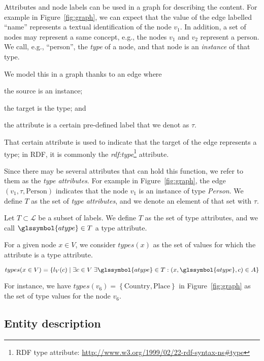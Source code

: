 Attributes and node labels can be used in a graph for describing the content. For example in Figure~\ref{fig:graph}, we can expect that the value of the edge labelled ``name'' represents a textual identification of the node $v_1$. In addition, a set of nodes may represent a same concept, e.g., the nodes $v_1$ and $v_2$ represent a person. We call, e.g., ``person'', the \emph{type} of a node, and that node is an \emph{instance} of that type.

We model this in a graph thanks to an edge where
\begin{inparaenum}[(1)]
\item the source is an instance;
\item the target is the type; and
\item the attribute is a certain pre-defined label that we denot as $\tau$.
\end{inparaenum}
That certain attribute is used to indicate that the target of the edge represents a type; in RDF, it is commonly the \emph{rdf:type}\footnote{RDF type attribute: \url{http://www.w3.org/1999/02/22-rdf-syntax-ns\#type}} attribute.

Since there may be several attributes that can hold this function, we refer to them as the \emph{type attributes}. For example in Figure~\ref{fig:graph}, the edge $(v_1, \tau, \text{Person})$ indicates that the node $v_1$ is an instance of type \emph{Person}.
We define $T$ as the set of \emph{type attributes}, and we denote an element of that set with $\tau$.%

\begin{definition}
Let $T \subset \mathcal{L}$ be a subset of labels.
We define $T$ as the set of type attributes, and we call $\glssymbol{atype} \in T$ a type attribute.
\end{definition}

For a given node $x \in V$, we consider $types(x)$ as the set of values for which the attribute is a type attribute.

$$
types(x\in V) = \left\lbrace l_V(c) \mid \exists c \in V\; \exists \glssymbol{atype} \in T: (x, \glssymbol{atype}, c) \in A \right\rbrace
$$

For instance, we have $types\left(v_6\right) = \left\{ \text{Country}, \text{Place} \right\}$ in Figure~\ref{fig:graph} as the set of type values for the node $v_6$.

\subsection{Entity description}
\label{sec:entity-description}

